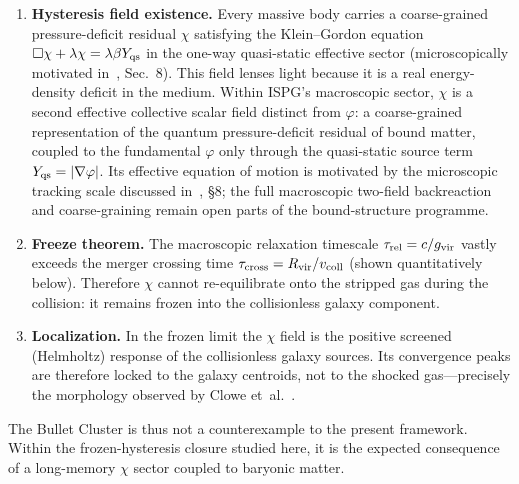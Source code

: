 \documentclass[11pt]{article}
\begin{document}
\begin{enumerate}
  \item \textbf{Hysteresis field existence.}
    Every massive body carries a coarse-grained pressure-deficit
    residual $\chi$ satisfying the Klein--Gordon equation
    $\Box\chi+\lambda\chi=\lambda\beta Y_{\rm qs}$
    in the one-way quasi-static effective sector
    (microscopically motivated in~\cite{Lotishvili2026Q},
    Sec.~8).  This field lenses light because it is a real
    energy-density deficit in the medium.
    Within ISPG's macroscopic sector, $\chi$ is a second
    effective collective scalar field distinct from $\varphi$: a coarse-grained
    representation of the quantum pressure-deficit residual of
    bound matter, coupled to the fundamental $\varphi$ only
    through the quasi-static source term
    $Y_{\rm qs}=|\nabla\varphi|$.  Its effective equation of
    motion is motivated by the microscopic tracking scale
    discussed in~\cite{Lotishvili2026Q}, §8; the full
    macroscopic two-field backreaction and coarse-graining
    remain open parts of the bound-structure programme.
  \item \textbf{Freeze theorem.}
    The macroscopic relaxation timescale
    $\tau_{\rm rel}=c/g_{\rm vir}$ vastly exceeds the merger
    crossing time $\tau_{\rm cross}=R_{\rm vir}/v_{\rm coll}$
    (shown quantitatively below).  Therefore $\chi$ cannot
    re-equilibrate onto the stripped gas during the collision:
    it remains frozen into the collisionless galaxy component.
  \item \textbf{Localization.}
    In the frozen limit the $\chi$ field is the positive
    screened (Helmholtz) response of the collisionless galaxy
    sources.  Its convergence peaks are therefore locked to the
    galaxy centroids, not to the shocked gas---precisely the
    morphology observed by Clowe et~al.~\cite{Clowe2006}.
\end{enumerate}

\noindent
The Bullet Cluster is thus not a counterexample to the present
framework.  Within the frozen-hysteresis closure studied here,
it is the expected consequence of a long-memory $\chi$ sector
coupled to baryonic matter.
\end{document}
